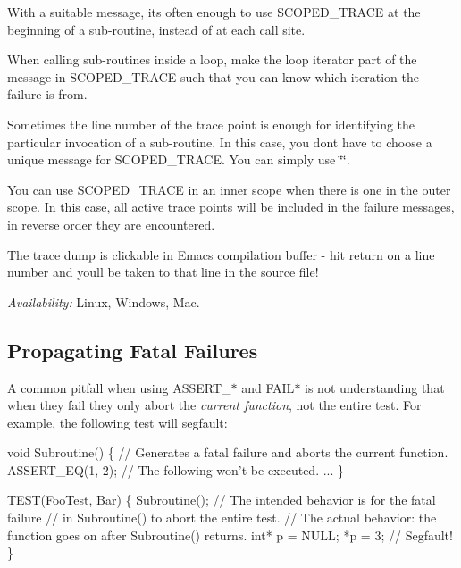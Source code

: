 \begin{DoxyEnumerate}
\item With a suitable message, it\textquotesingle{}s often enough to use {\ttfamily S\+C\+O\+P\+E\+D\+\_\+\+T\+R\+A\+CE} at the beginning of a sub-\/routine, instead of at each call site.
\end{DoxyEnumerate}
\begin{DoxyEnumerate}
\item When calling sub-\/routines inside a loop, make the loop iterator part of the message in {\ttfamily S\+C\+O\+P\+E\+D\+\_\+\+T\+R\+A\+CE} such that you can know which iteration the failure is from.
\end{DoxyEnumerate}
\begin{DoxyEnumerate}
\item Sometimes the line number of the trace point is enough for identifying the particular invocation of a sub-\/routine. In this case, you don\textquotesingle{}t have to choose a unique message for {\ttfamily S\+C\+O\+P\+E\+D\+\_\+\+T\+R\+A\+CE}. You can simply use {\ttfamily \char`\"{}\char`\"{}}.
\end{DoxyEnumerate}
\begin{DoxyEnumerate}
\item You can use {\ttfamily S\+C\+O\+P\+E\+D\+\_\+\+T\+R\+A\+CE} in an inner scope when there is one in the outer scope. In this case, all active trace points will be included in the failure messages, in reverse order they are encountered.
\end{DoxyEnumerate}
\begin{DoxyEnumerate}
\item The trace dump is clickable in Emacs\textquotesingle{} compilation buffer -\/ hit return on a line number and you\textquotesingle{}ll be taken to that line in the source file!
\end{DoxyEnumerate}

{\itshape Availability\+:} Linux, Windows, Mac.

\subsection*{Propagating Fatal Failures}

A common pitfall when using {\ttfamily A\+S\+S\+E\+R\+T\+\_\+$\ast$} and {\ttfamily F\+A\+I\+L$\ast$} is not understanding that when they fail they only abort the {\itshape current function}, not the entire test. For example, the following test will segfault\+: 
\begin{DoxyCode}
void Subroutine() \{
  // Generates a fatal failure and aborts the current function.
  ASSERT\_EQ(1, 2);
  // The following won't be executed.
  ...
\}

TEST(FooTest, Bar) \{
  Subroutine();
  // The intended behavior is for the fatal failure
  // in Subroutine() to abort the entire test.
  // The actual behavior: the function goes on after Subroutine() returns.
  int* p = NULL;
  *p = 3; // Segfault!
\}
\end{DoxyCode}


